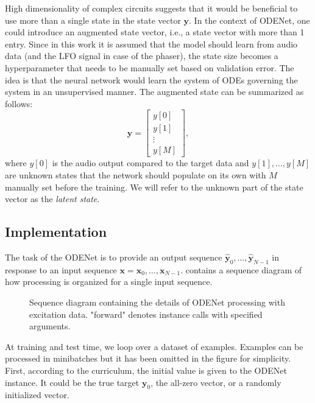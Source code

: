High dimensionality of complex circuits suggests that it would be beneficial to use more than a single state in the state vector $\pmb{y}$. In the context of ODENet, one could introduce an augmented state vector, i.e., a state vector with more than 1 entry. Since in this work it is assumed that the model should learn from audio data (and the LFO signal in case of the phaser), the state size becomes a hyperparameter that needs to be manually set based on validation error. The idea is that the neural network would learn the system of \acp{ODE} governing the system in an unsupervised manner. The augmented state can be summarized as follows:
\begin{equation}
  \pmb{y} = \begin{bmatrix}
    y[0] \\
    y[1] \\
    \vdots \\
    y[M]
  \end{bmatrix},
\end{equation}
where $y[0]$ is the audio output compared to the target data and $y[1], \dots, y[M]$ are unknown states that the network should populate on its own with $M$ manually set before the training. We will refer to the unknown part of the state vector as the \emph{latent state}.

\subsection{Implementation}
\label{subsec:odenet_implementation}

The task of the ODENet is to provide an output sequence $\hat{\pmb{y}}_0, \dots, \hat{\pmb{y}}_{N-1}$ in response to an input sequence $\pmb{x} = \pmb{x}_0, \dots, \pmb{x}_{N-1}$.  contains a sequence diagram of how processing is organized for a single input sequence.

\begin{figure}
  \centering
  \scalebox{0.9}{}
  \caption{Sequence diagram containing the details of ODENet processing with excitation data. "forward" denotes instance calls with specified arguments.}
  \label{fig:odenet_sequence_diagram}
\end{figure}

At training and test time, we loop over a dataset of examples. Examples can be processed in minibatches but it has been omitted in the figure for simplicity. First, according to the curriculum, the initial value is given to the ODENet instance. It could be the true target $\pmb{y}_0$, the all-zero vector, or a randomly initialized vector. 

